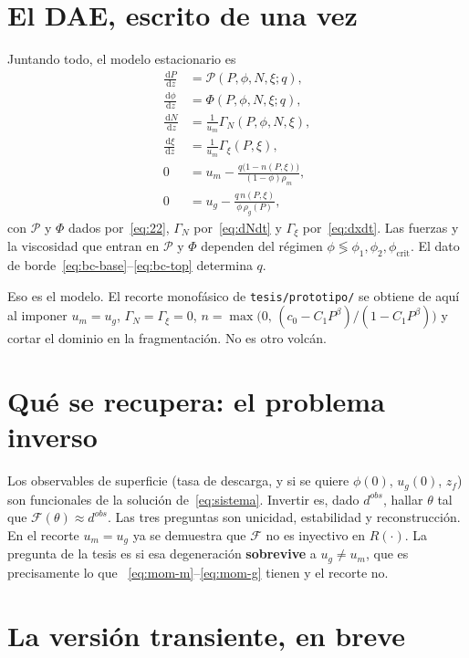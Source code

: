 \documentclass[11pt,a4paper]{article}
\newcommand{\dd}{\,\mathrm{d}}
\begin{document}
\section{El DAE, escrito de una vez}

Juntando todo, el modelo estacionario es
\begin{equation}
\label{eq:sistema}
\begin{aligned}
\frac{\dd P}{\dd z}
&= \mathcal{P}(P,\phi,N,\xi;q),\\
\frac{\dd\phi}{\dd z}
&= \Phi(P,\phi,N,\xi;q),\\
\frac{\dd N}{\dd z}
&= \frac{1}{u_m}\Gamma_N(P,\phi,N,\xi),\\
\frac{\dd\xi}{\dd z}
&= \frac{1}{u_m}\Gamma_\xi(P,\xi),\\
0
&= u_m-\frac{q\bigl(1-n(P,\xi)\bigr)}{(1-\phi)\rho_m},\\
0
&= u_g-\frac{q\,n(P,\xi)}{\phi\,\rho_g(P)},
\end{aligned}
\end{equation}
con $\mathcal{P}$ y $\Phi$ dados por~\eqref{eq:22}, $\Gamma_N$
por~\eqref{eq:dNdt} y $\Gamma_\xi$ por~\eqref{eq:dxdt}. Las fuerzas y
la viscosidad que entran en $\mathcal{P}$ y $\Phi$ dependen del
régimen $\phi\lessgtr\phi_1,\phi_2,\phi_{\mathrm{crit}}$. El dato de
borde~\eqref{eq:bc-base}--\eqref{eq:bc-top} determina $q$.

Eso es el modelo. El recorte monofásico de
\texttt{tesis/prototipo/} se obtiene de aquí al imponer
$u_m=u_g$, $\Gamma_N=\Gamma_\xi=0$,
$n=\max\bigl(0,\,(c_0-C_1P^\beta)/(1-C_1P^\beta)\bigr)$
y cortar el dominio en la fragmentación. No es otro volcán.

\section{Qué se recupera: el problema inverso}

Los observables de superficie (tasa de descarga, y si se quiere
$\phi(0)$, $u_g(0)$, $z_f$) son funcionales de la solución
de~\eqref{eq:sistema}. Invertir es, dado $d^{obs}$, hallar $\theta$
tal que $\mathcal{F}(\theta)\approx d^{obs}$. Las tres preguntas son
unicidad, estabilidad y reconstrucción. En el recorte
$u_m=u_g$ ya se demuestra que $\mathcal{F}$ no es inyectivo en
$R(\cdot)$. La pregunta de la tesis es si esa degeneración
\textbf{sobrevive} a $u_g\neq u_m$, que es precisamente lo que
~\eqref{eq:mom-m}--\eqref{eq:mom-g} tienen y el recorte no.

\section{La versión transiente, en breve}
\end{document}
